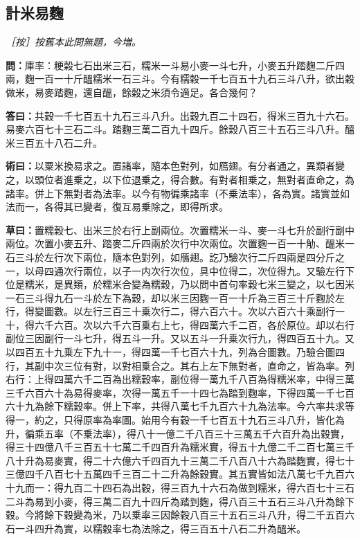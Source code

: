 \documentclass[11pt,a4paper]{article}
\newcommand{\Question}[1]{\par\noindent\textbf{\color{problemcolor}問：}#1\par}
\newcommand{\Answer}[1]{\par\noindent\textbf{\color{answercolor}答曰：}#1\par}
\newcommand{\Method}[1]{\par\noindent\textbf{\color{methodcolor}術曰：}#1\par}
\newcommand{\Working}[1]{\par\noindent\textbf{草曰：}#1\par}
\newcommand{\EditorialNote}[1]{\par\noindent\textit{［按］#1}\par}
\begin{document}
\subsection*{\color{sectioncolor}計米易麴}

\EditorialNote{按舊本此問無題，今増。}

\Question{庫率：粳榖七石出米三石，糯米一斗易小麥一斗七升，小麥五升踏麴二斤四兩，麴一百一十斤醞糯米一石三斗。今有糯穀一千七百五十九石三斗八升，欲出穀做米，易麥踏麴，還自醞，餘穀之米須令適足。各合幾何？}

\Answer{共穀一千七百五十九石三斗八升。出穀九百二十四石，得米三百九十六石。易麥六百七十三石二斗。踏麴三萬二百九十四斤。餘榖八百三十五石三斗八升。醞米三百五十八石二升。}

\Method{以粟米換易求之。置諸率，隨本色對列，如鴈翅。有分者通之，異類者變之，以頭位者進乗之，以下位退乗之，得合數。有對者相乗之，無對者直命之，為諸率。併上下無對者為法率。以今有物徧乘諸率（不乗法率），各為實。諸實並如法而一，各得其已變者，復互易乗除之，即得所求。}

\Working{置糯穀七、出米三於右行上副兩位。次置糯米一斗、麥一斗七升於副行副中兩位。次置小麥五升、踏麥二斤四兩於次行中次兩位。次置麴一百一十觔、醞米一石三斗於左行次下兩位，隨本色對列，如鴈翅。訖乃驗次行二斤四兩是四分斤之一，以母四通次行兩位，以子一内次行次位，具中位得二，次位得九。又驗左行下位是糯米，是異類，於糯米合變為糯穀，乃以問中首句率穀七米三變之，以七因米一石三斗得九石一斗於左下為穀，却以米三因麴一百一十斤為三百三十斤麴於左行，得變圖數。以左行三百三十乗次行二，得六百六十。次以六百六十乘副行一十，得六千六百。次以六千六百乗右上七，得四萬六千二百，各於原位。却以右行副位三因副行一斗七升，得五斗一升。又以五斗一升乗次行九，得四百五十九。又以四百五十九乗左下九十一，得四萬一千七百六十九，列為合圖數。乃驗合圖四行，其副中次三位有對，以對相乗合之。其右上左下無對者，直命之，皆為率。列右行：上得四萬六千二百為出糯穀率，副位得一萬九千八百為得糯米率，中得三萬三千六百六十為易得麥率，次得一萬五千一十四七為踏到麴率，下得四萬一千七百六十九為餘下糯榖率。併上下率，共得八萬七千九百六十九為法率。今六率共求等得一，約之，只得原率為率圖。始用今有穀一千七百五十九石三斗八升，皆化為升，徧乘五率（不乗法率），得八十一億二千八百三十三萬五千六百升為出穀實，得三十四億八千三百五十七萬二千四百升為糯米實，得五十九億二千二百七萬三千八十升為易麥實，得二十六億六千四百九十三萬二千八百八十六為踏麴實，得七十三億四千八百七十五萬四千三百二十二升為餘穀實。其五實皆如法八萬七千九百六十九而一：得九百二十四石為出穀，得三百九十六石為做到糯米，得六百七十三石二斗為易到小麥，得三萬二百九十四斤為踏到麴，得八百三十五石三斗八升為餘下穀。今將餘下穀變為米，乃以乗率三因餘穀八百三十五石三斗八升，得二千五百六石一斗四升為實，以糯穀率七為法除之，得三百五十八石二升為醞米。}
\end{document}
